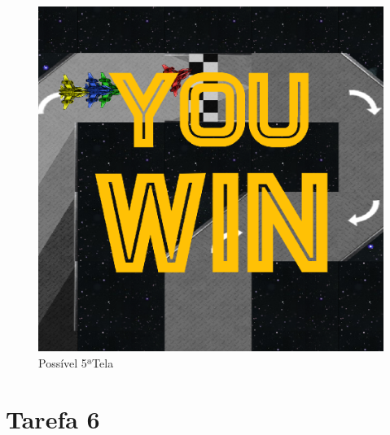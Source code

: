 \documentclass[a4paper]{report} %
\begin{document}
           
           \begin{figure}[h!]
               \centering
               \includegraphics [scale = 0.15] {sc4.png}
               \caption{Possível 5ªTela}
           \end{figure}
           
    
           \section{Tarefa 6}
           
\end{document}
